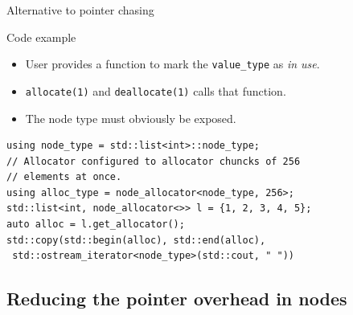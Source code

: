 \documentclass[10pt,aspectratio=169]{beamer}
\begin{document}
\begin{frame}{Alternative to pointer chasing}
\begin{block} {Code example}
\begin{itemize}
\item User provides a function to mark the \texttt{value\_type}
as {\it in use}.
\item \texttt{allocate(1)} and \texttt{deallocate(1)} calls that 
function.
\item The node type must obviously be exposed.
\end{itemize}
\end{block}

\begin{lstlisting}
using node_type = std::list<int>::node_type;
// Allocator configured to allocator chuncks of 256
// elements at once.
using alloc_type = node_allocator<node_type, 256>;
std::list<int, node_allocator<>> l = {1, 2, 3, 4, 5};
auto alloc = l.get_allocator();
std::copy(std::begin(alloc), std::end(alloc),
 std::ostream_iterator<node_type>(std::cout, " "))
\end{lstlisting}

\end{frame}

\subsection{Reducing the pointer overhead in nodes}
\end{document}
